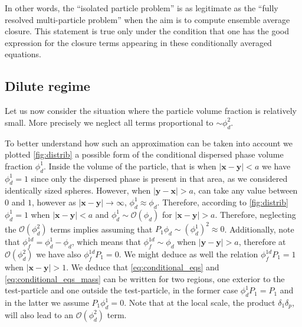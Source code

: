 In other words, the ``isolated particle problem'' is as legitimate as the ``fully resolved multi-particle problem'' when the aim is to compute ensemble average closure.
This statement is true only under the condition that one has the good expression for the closure terms appearing in these conditionally averaged equations. 

\subsection{Dilute regime}
Let us now consider the situation where the particle volume fraction is relatively small. 
More precisely we neglect all terms proportional to $\sim \phi_d^2$. 

To better understand how such an approximation can be taken into account we plotted \ref{fig:distrib} a possible form of the conditional dispersed phase volume fraction $\phi_d^1$.
Inside the volume of the particle, that is when $|\textbf{x}-\textbf{y}| < a$ we have $\phi_d^1 = 1$ since only the dispersed phase is present in that area, as we considered identically sized spheres. 
However, when $|\textbf{y} - \textbf{x}| >a$, can take any value between $0$ and $1$, however as $|\textbf{x}- \textbf{y}|\to\infty$, $\phi_d^1 \approx \phi_d$.
Therefore, according to \ref{fig:distrib} $\phi_d^1 = 1$ when $|\textbf{x}-\textbf{y}| < a$  and $\phi_d^1 \sim \mathcal{O}(\phi_d)$ for $|\textbf{x}-\textbf{y}| > a$. 
Therefore, neglecting the $\mathcal{O}(\phi_d^2)$ terms  implies assuming that $P_1 \phi_d \sim (\phi_d^1)^2 \approx 0$. 
Additionally, note that $\phi_f^{1d} = \phi_d^1 - \phi_d$, which means that $\phi_f^{1d} \sim \phi_d$ when $|\textbf{y} -\textbf{y}| > a$, therefore at  $\mathcal{O}(\phi_d^2)$ we have also $\phi_f^{1d} P_1= 0$.
We might deduce as well the relation $\phi_f^{1d} P_1 = 1$ when $|\textbf{x}-\textbf{y}| >1$. 
We deduce that \ref{eq:conditional_eqs} and \ref{eq:conditional_eqs_mass} can be written for two regions, one exterior to the test-particle and one outside the test-particle, in the former case $\phi_d^1P_1  = P_1$ and in the latter we assume $P_1 \phi_d^1 = 0$. 
Note that at the local scale, the product $\delta_1\delta_p$, will also lead to an $\mathcal{O}(\phi_d^2)$ term.  

